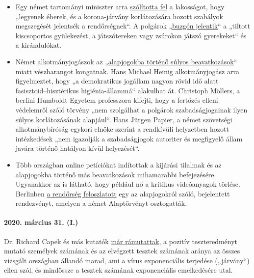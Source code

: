 \begin{itemize}
\tightlist
\item
  Egy német tartományi miniszter arra
  \href{https://de.nachrichten.yahoo.com/strobl-b\%C3\%BCrger-verst\%C3\%B6\%C3\%9Fe-gegen-corona-regeln-polizei-melden-095746341.html}{szólította
  fel} a lakosságot, hogy „legyenek éberek, és a korona-járvány
  korlátozására hozott szabályok megszegését jelentsék a rendőrségnek``.
  A polgárok
  „\href{https://www.br.de/nachrichten/bayern/buerger-melden-eifrig-verstoesse-gegen-corona-regeln,RuGXp1h}{buzgón
  jelentik}`` a „tiltott kiscsoportos gyülekezést, a játszótereken vagy
  zsúrokon játszó gyerekeket`` és a kirándulókat.
\item
  Német alkotmányjogászok az
  „\href{https://www.focus.de/politik/deutschland/corona-regelungen-der-regierung-medizin-darf-nicht-gefaehrlicher-sein-als-die-krankheit_id_11827625.html}{alapjogokba
  történő súlyos beavatkozások}`` miatt vészharangot kongatnak. Hans
  Michael Heinig alkotmányjogász arra figyelmeztet, hogy „a demokratikus
  jogállam nagyon rövid idő alatt fasisztoid--hisztérikus
  higiénia-állammá`` alakulhat át. Christoph Möllers, a berlini Humboldt
  Egyetem professzora kifejti, hogy a fertőzés elleni védelemről szóló
  törvény „nem szolgálhat a polgárok szabadságjogainak ilyen súlyos
  korlátozásának alapjául``. Hans Jürgen Papier, a német szövetségi
  alkotmánybíróság egykori elnöke szerint a rendkívüli helyzetben hozott
  intézkedések „nem igazolják a szabadságjogok autoriter és megfigyelő
  állam javára történő hatályon kívül helyezését``.
\item
  Több országban online petíciókat indítottak a kijárási tilalmak és az
  alapjogokba történő más beavatkozások mihamarabbi befejezésére.
  Ugyanakkor az is látható, hogy például nő a kritikus videóanyagok
  törlése. Berlinben
  \href{https://www.heise.de/tp/features/Wenn-Demonstranten-zu-Gefaehrdern-erklaert-werden-4692869.html}{a
  rendőrség feloszlatott} egy az alapjogokról szóló, bejelentett
  rendezvényt, amelyen a német Alaptörvényt osztogatták.
\end{itemize}

\hypertarget{2020-muxe1rcius-31-i}{%
\paragraph{2020. március 31. (I.)}\label{2020-muxe1rcius-31-i}}

Dr. Richard Capek és más kutatók
\href{https://coronadaten.wordpress.com/}{már rámutattak}, a pozitív
teszteredményt mutató személyek számának és az elvégzett tesztek
számának aránya az összes vizsgált országban állandó marad, ami a vírus
exponenciális terjedése („járvány``) ellen szól, és mindössze a tesztek
számának exponenciális emelkedésére utal.

